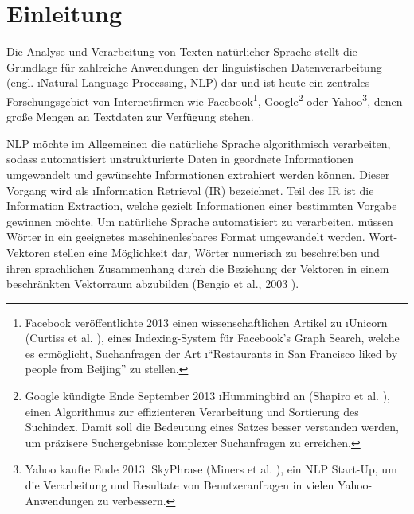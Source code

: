 \chapter{Einleitung}\label{c.einleitung}
Die Analyse und Verarbeitung von Texten natürlicher Sprache stellt die Grundlage für zahlreiche Anwendungen der linguistischen Datenverarbeitung (engl. \i{Natural Language Processing}, NLP) dar und ist heute ein zentrales Forschungsgebiet von Internetfirmen wie Facebook\footnote{Facebook veröffentlichte 2013 einen wissenschaftlichen Artikel zu \i{Unicorn} (Curtiss et al. \citep{Curtiss2013}), eines Indexing-System für Facebook's Graph Search, welche es ermöglicht, Suchanfragen der Art \i{"`Restaurants in San Francisco liked by people from Beijing"'} zu stellen.}, Google\footnote{Google kündigte Ende September 2013 \i{Hummingbird} an (Shapiro et al. \citep{Shapiro2013}), einen Algorithmus zur effizienteren Verarbeitung und Sortierung des Suchindex. Damit soll die Bedeutung eines Satzes besser verstanden werden, um präzisere Suchergebnisse komplexer Suchanfragen zu erreichen.} oder Yahoo\footnote{Yahoo kaufte Ende 2013 \i{SkyPhrase} (Miners et al. \citep{Miners2013}), ein NLP Start-Up, um die Verarbeitung und Resultate von Benutzeranfragen in vielen Yahoo-Anwendungen zu verbessern.}, denen große Mengen an Textdaten zur Verfügung stehen.

NLP möchte im Allgemeinen die natürliche Sprache algorithmisch verarbeiten, sodass automatisiert unstrukturierte Daten in geordnete Informationen umgewandelt und gewünschte Informationen extrahiert werden können. Dieser Vorgang wird als \i{Information Retrieval} (IR) bezeichnet. Teil des IR ist die Information Extraction, welche gezielt Informationen einer bestimmten Vorgabe gewinnen möchte. Um natürliche Sprache automatisiert zu verarbeiten, müssen Wörter in ein geeignetes maschinenlesbares Format umgewandelt werden. Wort-Vektoren stellen eine Möglichkeit dar, Wörter numerisch zu beschreiben und ihren sprachlichen Zusammenhang durch die Beziehung der Vektoren in einem beschränkten Vektorraum abzubilden (Bengio et al., 2003 \citep{Bengio2003}).


